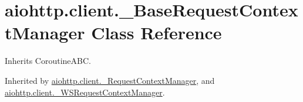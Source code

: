 \hypertarget{classaiohttp_1_1client_1_1___base_request_context_manager}{}\section{aiohttp.\+client.\+\_\+\+Base\+Request\+Context\+Manager Class Reference}
\label{classaiohttp_1_1client_1_1___base_request_context_manager}


Inherits Coroutine\+A\+BC.



Inherited by \hyperlink{classaiohttp_1_1client_1_1___request_context_manager}{aiohttp.\+client.\+\_\+\+Request\+Context\+Manager}, and \hyperlink{classaiohttp_1_1client_1_1___w_s_request_context_manager}{aiohttp.\+client.\+\_\+\+W\+S\+Request\+Context\+Manager}.

